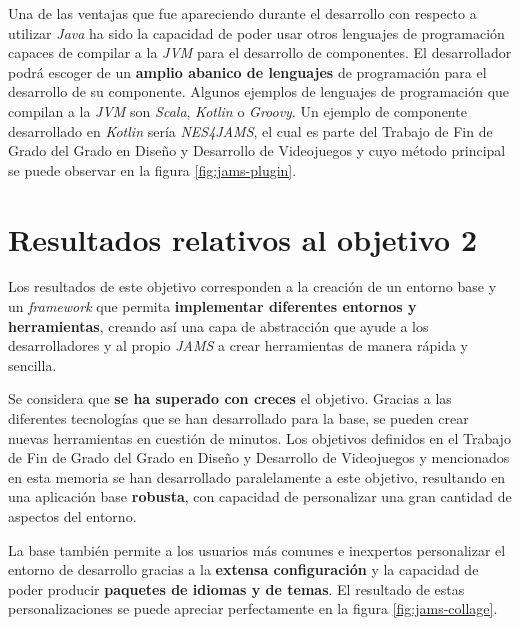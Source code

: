 \noindent Una de las ventajas que fue apareciendo durante el
desarrollo con respecto a utilizar \textit{Java} ha sido la
capacidad de poder usar otros lenguajes de programación capaces
de compilar a la \textit{JVM} para el desarrollo de componentes.
El desarrollador podrá escoger de un \textbf{amplio abanico de lenguajes}
de programación para el desarrollo de su componente.
Algunos ejemplos de lenguajes de programación que compilan a la \textit{JVM}
son \textit{Scala}, \textit{Kotlin} o \textit{Groovy}.
Un ejemplo de componente desarrollado en \textit{Kotlin} sería
\textit{NES4JAMS}, el cual es parte del Trabajo de Fin de Grado del Grado en
Diseño y Desarrollo de Videojuegos y cuyo método principal se puede observar
en la figura \ref{fig:jams-plugin}.


\section{Resultados relativos al objetivo 2}\label{sec:resultados-relativos-al-objetivo-2}

Los resultados de este objetivo corresponden a la creación de
un entorno base y un \textit{framework} que permita \textbf{implementar
diferentes entornos y herramientas}, creando así una capa
de abstracción que ayude a los desarrolladores y al propio
\textit{JAMS} a crear herramientas de manera rápida y sencilla.

\noindent Se considera que \textbf{se ha superado con creces}
el objetivo.
Gracias a las diferentes tecnologías que se han desarrollado
para la base, se pueden crear nuevas herramientas en cuestión
de minutos.
Los objetivos definidos en el Trabajo de Fin de Grado del Grado en
Diseño y Desarrollo de Videojuegos y mencionados en esta memoria
se han desarrollado paralelamente a este objetivo, resultando
en una aplicación base \textbf{robusta}, con capacidad de personalizar
una gran cantidad de aspectos del entorno.

\noindent La base también permite a los usuarios más comunes e
inexpertos personalizar el entorno de desarrollo gracias a la
\textbf{extensa configuración} y la capacidad de poder producir
\textbf{paquetes de idiomas y de temas}.
El resultado de estas personalizaciones se puede apreciar
perfectamente en la figura \ref{fig:jams-collage}.

